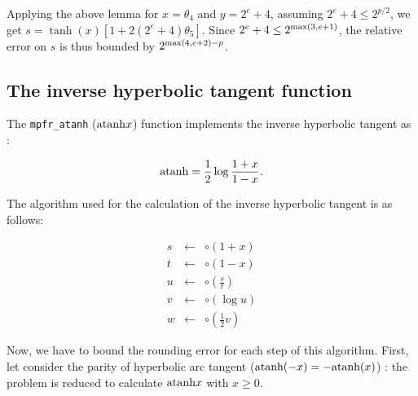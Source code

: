 \documentclass[12pt]{amsart}
\def\n{\textnormal}
\begin{document}
Applying the above lemma for $x=\theta_4$ and $y=2^e+4$,
assuming $2^e+4 \leq 2^{p/2}$,
we get $s = \tanh(x) [1 + 2(2^e+4)\theta_5]$.
Since $2^e+4 \leq 2^{{\rm max}(3,e+1)}$,
the relative error on $s$ is thus bounded by $2^{{\rm max}(4,e+2)-p}$.

\subsection{The inverse hyperbolic tangent function}

The {\tt mpfr\_atanh} ($\n{atanh}{x}$) function implements the inverse
hyperbolic tangent as :

\[\n{atanh} = \frac{1}{2} \log \frac{1+x}{1-x}.\]

The algorithm used for the calculation of the inverse hyperbolic tangent is
as follows:

\begin{eqnarray}\nonumber
s&\leftarrow&\circ(1+x)\\\nonumber
t&\leftarrow&\circ(1-x)\\\nonumber
u&\leftarrow&\circ(\frac{s}{t})\\\nonumber
v&\leftarrow&\circ(\log u)\\\nonumber
w&\leftarrow&\circ(\frac{1}{2} v)
\end{eqnarray}


Now, we have to bound the rounding error for each step of this
algorithm. First, let consider the parity of hyperbolic arc tangent
($\n{atanh}(-x)=-\n{atanh}(x)$) : the problem is reduced to calculate
$\n{atanh} x$ with $x \geq 0$.
\end{document}

